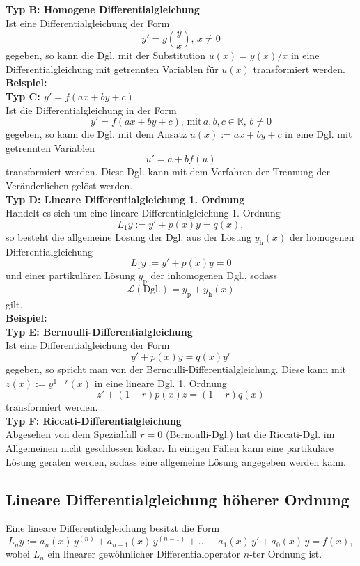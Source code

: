 \noindent
\textbf{Typ B: Homogene Differentialgleichung}\\
Ist eine Differentialgleichung der Form
$$
y' =g \left( \dfrac{y}{x} \right), \, x \neq 0 
$$
gegeben, so kann die Dgl. mit der Substitution $u(x) = y(x)/x$ in eine Differentialgleichung mit getrennten Variablen f\"ur $u(x)$ transformiert werden.\\

\textbf{Beispiel:} \\

\noindent
\textbf{Typ C: $y' = f(ax+by+c)$}\\
Ist die Differentialgleichung in der Form 
$$
y' = f(ax+by+c), \, \text{mit} \, a,b,c \in \mathbb{R}, \, b \neq 0
$$
gegeben, so kann die Dgl. mit dem Ansatz $u(x):= ax+by+c$ in eine Dgl. mit getrennten Variablen
$$
u' = a +b f(u)
$$
transformiert werden. Diese Dgl. kann mit dem Verfahren der Trennung der Ver\"anderlichen gel\"ost werden.\\

\noindent
\textbf{Typ D: Lineare Differentialgleichung 1. Ordnung}\\
Handelt es sich um eine lineare Differentialgleichung 1. Ordnung
$$
L_1 y:= y' +p(x)y = q(x),
$$
so besteht die allgemeine L\"osung der Dgl. aus der L\"osung $y_{\text{h}}(x)$ der homogenen Differentialgleichung
$$
L_1 y := y' +p(x)y = 0
$$
und einer partikul\"aren L\"osung $y_{\text{p}}$ der inhomogenen Dgl.,
sodass
$$
\mathcal{L}(\text{Dgl.}) = y_{\text{p}} + y_{\text{h}}(x)
$$
gilt. \\
\textbf{Beispiel:} \\

\noindent
\textbf{Typ E: Bernoulli-Differentialgleichung}\\
Ist eine Differentialgleichung der Form
$$
y' + p(x)y = q(x) y^r
$$
gegeben, so spricht man von der Bernoulli-Differentialgleichung.
Diese kann mit $z(x):= y^{1-r}(x)$ in eine lineare Dgl. 1. Ordnung 
$$
z' +(1-r)p(x)z = (1-r)q(x)
$$
transformiert werden.  \\


\noindent
\textbf{Typ F: Riccati-Differentialgleichung}\\
Abgesehen von dem Spezialfall $r=0$ (Bernoulli-Dgl.) hat die Riccati-Dgl. im Allgemeinen nicht geschlossen l\"osbar. In einigen F\"allen kann eine partikul\"are L\"osung geraten werden, sodass eine allgemeine L\"osung angegeben werden kann. \\


\noindent
\subsection*{Lineare Differentialgleichung h\"oherer Ordnung}
Eine lineare Differentialgleichung besitzt die Form
$$
L_n y :=a_n(x)\, y^{(n)} + a_{n-1}(x)\, y^{(n-1)} + \dots + a_1(x)\, y' + a_0(x)\, y = f(x),
$$
wobei $L_n$ ein linearer gew\"ohnlicher Differentialoperator $n$-ter Ordnung ist.  \\

